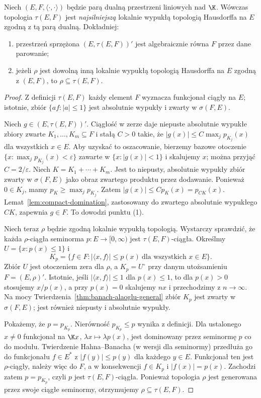 \begin{twierdzenie}\label{thm:mackey-arens}
Niech $(E,F,\langle\cdot,\cdot\rangle)$ będzie parą dualną
przestrzeni liniowych nad $\K$. Wówczas topologia
$\tau(E,F)$ jest \emph{najsilniejszą} lokalnie wypukłą
topologią Hausdorffa na $E$ zgodną z tą parą dualną.
Dokładniej:
\begin{enumerate}
\item przestrzeń sprzężona $(E,\tau(E,F))'$ jest
      algebraicznie równa $F$ przez dane parowanie;
\item jeżeli $\rho$ jest dowolną inną lokalnie wypukłą topologią
      Hausdorffa na $E$ zgodną z $(E,F)$, to $\rho\subseteq\tau(E,F)$.
\end{enumerate}
\end{twierdzenie}
\begin{proof}
Z definicji $\tau(E,F)$ każdy element $F$ wyznacza
funkcjonał ciągły na $E$; istotnie, zbiór
$\{af:|a|\le1\}$ jest absolutnie wypukły i zwarty
w $\sigma(F,E)$.

Niech $g\in(E,\tau(E,F))'$. Ciągłość w zerze daje
niepuste absolutnie wypukłe zbiory zwarte
$K_1,\ldots,K_m\subseteq F$ i stałą $C>0$ takie, że
$|g(x)|\le C\max_j p_{K_j}(x)$ dla wszystkich $x\in E$.
Aby uzyskać to oszacowanie, bierzemy bazowe otoczenie
$\{x:\max_j p_{K_j}(x)<\varepsilon\}$ zawarte w
$\{x:|g(x)|<1\}$ i skalujemy $x$; można przyjąć
$C=2/\varepsilon$. Niech $K=K_1+\cdots+K_m$.
Jest to niepusty, absolutnie wypukły zbiór zwarty
w $\sigma(F,E)$ jako obraz zwartego produktu przez dodawanie.
Ponieważ $0\in K_j$, mamy $p_K\ge\max_j p_{K_j}$.
Zatem $|g(x)|\le C p_K(x)=p_{CK}(x)$.
Lemat~\ref{lem:compact-domination}, zastosowany do zwartego
absolutnie wypukłego $CK$, zapewnia $g\in F$.
To dowodzi punktu (1).

Niech teraz $\rho$ będzie zgodną lokalnie wypukłą topologią.
Wystarczy sprawdzić, że każda $\rho$-ciągła seminorma
$p:E\to[0,\infty)$ jest $\tau(E,F)$-ciągła.
Określmy $U=\{x:p(x)\le1\}$ i
\[
 K_p=\{f\in F:|\langle x,f\rangle|\le p(x)
                 \ \text{dla wszystkich }x\in E\}.
\]
Zbiór $U$ jest otoczeniem zera dla $\rho$, a
$K_p=U^\circ$ przy danym utożsamieniu $F=(E,\rho)'$.
Istotnie, jeśli $|\langle x,f\rangle|\le1$ dla $p(x)\le1$,
to dla $p(x)>0$ stosujemy $x/p(x)$, a przy $p(x)=0$
skalujemy $nx$ i przechodzimy z $n\to\infty$.
Na mocy Twierdzenia~\ref{thm:banach-alaoglu-general}
zbiór $K_p$ jest zwarty w $\sigma(F,E)$;
jest również niepusty i absolutnie wypukły.

Pokażemy, że $p=p_{K_p}$. Nierówność $p_{K_p}\le p$
wynika z definicji. Dla ustalonego $x\ne0$ funkcjonał
na $\K x$, $\lambda x\mapsto\lambda p(x)$,
jest dominowany przez seminormę $p$ co do modułu.
Twierdzenie Hahna--Banacha (w wersji dla seminormy)
przedłuża go do funkcjonału $f\in E^*$ z
$|f(y)|\le p(y)$ dla każdego $y\in E$.
Funkcjonał ten jest $\rho$-ciągły, należy więc do $F$,
a w konsekwencji $f\in K_p$ i $|f(x)|=p(x)$.
Zachodzi zatem $p=p_{K_p}$, czyli $p$ jest
$\tau(E,F)$-ciągła. Ponieważ topologia $\rho$ jest
generowana przez swoje ciągłe seminormy, otrzymujemy
$\rho\subseteq\tau(E,F)$.
\end{proof}

